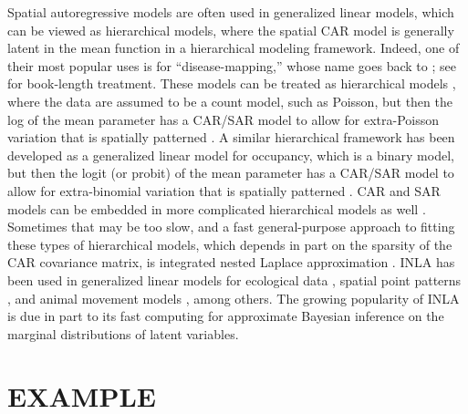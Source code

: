 \documentclass[11pt, titlepage]{article}\usepackage[]{graphicx}\usepackage[]{color}
\begin{document}
\begin{spacing}{1.9}
\begin{flushleft}
Spatial autoregressive models are often used in generalized linear models, which can be viewed as hierarchical models, where the spatial CAR model is generally latent in the mean function in a hierarchical modeling framework. Indeed, one of their most popular uses is for ``disease-mapping,'' whose name goes back to \citet{Clay:Kald:empi:1987}; see \citet{Laws:Baye:2009} for book-length treatment.  These models can be treated as hierarchical models \citep{Cres:Cald:Clar:VerH:acco:2009}, where the data are assumed to be a count model, such as Poisson, but then the log of the mean parameter has a CAR/SAR model to allow for extra-Poisson variation that is spatially patterned \citep[e.g.,][]{Ver:Jans:spac:2007}.  A similar hierarchical framework has been developed as a generalized linear model for occupancy, which is a binary model, but then the logit (or probit) of the mean parameter has a CAR/SAR model to allow for extra-binomial variation that is spatially patterned \citep{Mago:Ray:John:Valk:Daws:Bowm:mode:2007,Gard:Lawl:Ver:Mago:Kell:coar:2010,John:Conn:Hoot:Ray:Pond:spat:2013,Brom:John:Altw:Conq:spat:2014,Pole:Pond:Scha:Brow:Ray:John:occu:2014}.  CAR and SAR models can be embedded in more complicated hierarchical models as well \citep[e.g.,][]{Ver:Came:Bove:Lond:spat:2014}. Sometimes that may be too slow, and a fast general-purpose approach to fitting these types of hierarchical models, which depends in part on the sparsity of the CAR covariance matrix, is integrated nested Laplace approximation \citep[INLA,][]{Rue:Mart:Chop:appr:2009}. INLA has been used in generalized linear models for ecological data \citep[e.g.,][]{Haas:Hoot:Rizz:Meen:fore:2011,Aart:Fieb:Bras:Matt:quan:2013}, spatial point patterns \citep{Illi:Mart:Sorb:Gall:Zunz:Esqu:Trav:fitt:2013}, and animal movement models \citep{John:Hoot:Kuhn:esti:2013}, among others. The growing popularity of INLA is due in part to its fast computing for approximate Bayesian inference on the marginal distributions of latent variables.


\section*{EXAMPLE}




\end{flushleft}
\end{spacing}
\end{document}

